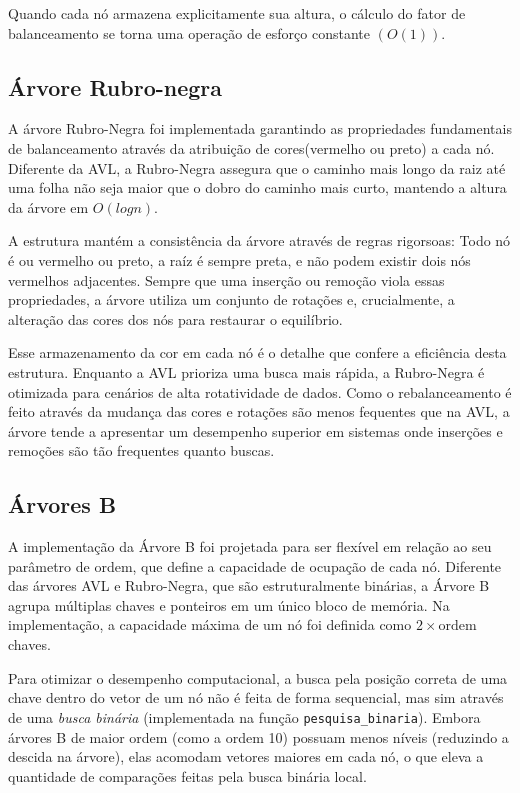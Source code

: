 \documentclass[a4paper, 12pt]{article}
\begin{document}
Quando cada nó armazena explicitamente sua altura, o cálculo do fator de balanceamento se torna
uma operação de esforço constante $(O(1))$.

\subsection{Árvore Rubro-negra}
A árvore Rubro-Negra foi implementada garantindo as propriedades fundamentais de balanceamento através da atribuição de cores(vermelho ou preto) a cada nó. Diferente da AVL, a Rubro-Negra assegura que o caminho mais longo da raiz até uma folha não seja maior que o dobro do caminho mais curto, mantendo a altura da árvore em $O(logn)$.

A estrutura mantém a consistência da árvore através de regras rigorsoas: Todo nó é ou vermelho ou preto, a raíz é sempre preta, e não podem existir dois nós vermelhos adjacentes. Sempre que uma inserção ou remoção viola essas propriedades, a árvore utiliza um conjunto de rotações e, crucialmente, a alteração das cores dos nós para restaurar o equilíbrio.

Esse armazenamento da cor em cada nó é o detalhe que confere a eficiência desta estrutura. Enquanto a AVL prioriza uma busca mais rápida, a Rubro-Negra é otimizada para cenários de alta rotatividade de dados. Como o rebalanceamento é feito através da mudança das cores e rotações são menos fequentes que na AVL, a árvore tende a apresentar um desempenho superior em sistemas onde inserções e remoções são tão frequentes quanto buscas.


\subsection{Árvores B}
A implementação da Árvore B foi projetada para ser flexível em relação ao seu parâmetro de ordem, que define a capacidade de ocupação de cada nó. Diferente das árvores AVL e Rubro-Negra, que são estruturalmente binárias, a Árvore B agrupa múltiplas chaves e ponteiros em um único bloco de memória. Na implementação, a capacidade máxima de um nó foi definida como $2 \times \text{ordem}$ chaves.

Para otimizar o desempenho computacional, a busca pela posição correta de uma chave dentro do vetor de um nó não é feita de forma sequencial, mas sim através de uma \textit{busca binária} (implementada na função \verb|pesquisa_binaria|). Embora árvores B de maior ordem (como a ordem 10) possuam menos níveis (reduzindo a descida na árvore), elas acomodam vetores maiores em cada nó, o que eleva a quantidade de comparações feitas pela busca binária local.
\end{document}
